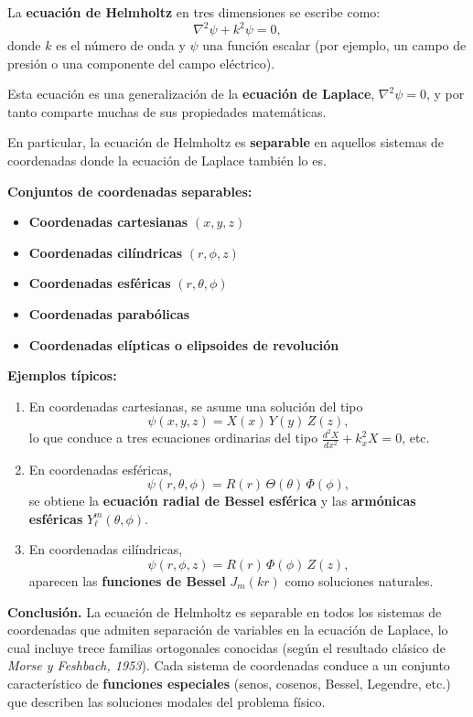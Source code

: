 \documentclass{article}
\begin{document}
La \textbf{ecuación de Helmholtz} en tres dimensiones se escribe como:
\[
\nabla^{2}\psi + k^{2}\psi = 0,
\]
donde \(k\) es el número de onda y \(\psi\) una función escalar (por ejemplo, un campo de presión o una componente del campo eléctrico).

Esta ecuación es una generalización de la \textbf{ecuación de Laplace},
\(\nabla^{2}\psi = 0\),
y por tanto comparte muchas de sus propiedades matemáticas.  

En particular, la ecuación de Helmholtz es \textbf{separable} en aquellos sistemas de coordenadas donde la ecuación de Laplace también lo es.

\textbf{Conjuntos de coordenadas separables:}
\begin{itemize}
  \item \textbf{Coordenadas cartesianas} \((x,y,z)\)
  \item \textbf{Coordenadas cilíndricas} \((r,\phi,z)\)
  \item \textbf{Coordenadas esféricas} \((r,\theta,\phi)\)
  \item \textbf{Coordenadas parabólicas}
  \item \textbf{Coordenadas elípticas o elipsoides de revolución}
\end{itemize}

\textbf{Ejemplos típicos:}
\begin{enumerate}
  \item En coordenadas cartesianas, se asume una solución del tipo
  \[
  \psi(x,y,z) = X(x)\,Y(y)\,Z(z),
  \]
  lo que conduce a tres ecuaciones ordinarias del tipo
  \(\frac{d^{2}X}{dx^{2}} + k_x^{2}X = 0\), etc.

  \item En coordenadas esféricas, 
  \[
  \psi(r,\theta,\phi) = R(r)\,\Theta(\theta)\,\Phi(\phi),
  \]
  se obtiene la \textbf{ecuación radial de Bessel esférica} y las 
  \textbf{armónicas esféricas} \(Y_{\ell}^{m}(\theta,\phi)\).

  \item En coordenadas cilíndricas,
  \[
  \psi(r,\phi,z) = R(r)\,\Phi(\phi)\,Z(z),
  \]
  aparecen las \textbf{funciones de Bessel} \(J_{m}(kr)\) como soluciones naturales.
\end{enumerate}

\textbf{Conclusión.}  
La ecuación de Helmholtz es separable en todos los sistemas de coordenadas que admiten separación de variables en la ecuación de Laplace, lo cual incluye trece familias ortogonales conocidas (según el resultado clásico de \textit{Morse y Feshbach, 1953}).  
Cada sistema de coordenadas conduce a un conjunto característico de \textbf{funciones especiales} (senos, cosenos, Bessel, Legendre, etc.) que describen las soluciones modales del problema físico.
\end{document}
